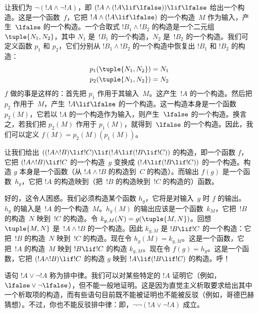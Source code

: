 \documentclass[../../../include/open-logic-section]{subfiles}
\begin{document}
\begin{ex}
让我们为 $\lnot(!A \land \lnot !A)$，即 $(!A \land (!A \lif \lfalse)) \lif \lfalse$ 给出一个构造。这是一个函数~$f$，它把 $!A \land (!A \lif \lfalse)$ 的一个构造~$M$ 作为输入，产生~$\lfalse$ 的一个构造。一个合取式 $!B_1 \land !B_2$ 的构造是一个二元组 $\tuple{N_1, N_2}$，其中 $N_1$ 是~$!B_1$ 的一个构造，$N_2$ 是~$!B_2$ 的一个构造。我们可定义函数 $p_1$ 和 $p_2$，它们分别从 $!B_1 \land !B_2$ 的一个构造中恢复出 $!B_1$ 和 $!B_2$ 的构造：
\begin{align*}
  p_1(\tuple{N_1, N_2}) &= N_1\\
  p_2(\tuple{N_1, N_2}) &= N_2
\end{align*}
$f$ 做的事是这样的：首先把 $p_1$ 作用于其输入~$M$。这产生~$!A$ 的一个构造。然后把 $p_2$ 作用于~$M$，产生~$!A \lif \lfalse$ 的一个构造。这一构造本身是一个函数~$p_2(M)$，它若以 $!A$ 的一个构造作为输入，则产生~$\lfalse$ 的一个构造。换言之，若我们把 $p_2(M)$ 作用于 $p_1(M)$，就得到~$\lfalse$ 的一个构造。因此，我们可以定义 $f(M) = p_2(M)(p_1(M))$。
\end{ex}

\begin{ex}
让我们给出 $((!A \land !B) \lif !C) \lif (!A \lif (!B \lif !C))$ 的构造，即一个函数 $f$，它把 $(!A \land !B) \lif !C$ 的一个构造~$g$ 变换成 $(!A \lif (!B \lif !C))$ 的一个构造。构造 $g$ 本身是一个函数（从 $!A \land !B$ 的构造到~$C$ 的构造）。而输出 $f(g)$ 是一个函数~$h_g$，它把 $!A$ 的构造映到（把~$!B$ 的构造映到~$!C$ 的构造的）函数。

好的，这令人困惑。我们必须构造某个函数 $h_g$，它将是对输入~$g$ 时 $f$ 的输出。~$h_g$ 的输入是~$!A$ 的一个构造~$M$。$h_g(M)$ 的输出应该是一个函数~$k_M$，它把~$!B$ 的构造~$N$ 映到~$!C$ 的构造。令 $k_{g,M}(N) = g(\tuple{M, N})$。回想 $\tuple{M, N}$ 是~$!A \land !B$ 的一个构造。因此 $k_{g,M}$ 是 $!B \lif !C$ 的一个构造：它把~$!B$ 的构造~$N$ 映到~$!C$ 的构造。现在令 $h_g(M) = k_{g,M}$。这是一个函数，它把~$!A$ 的构造~$M$ 映到 $!B \lif !C$ 的构造 $k_{g,M}$。现在令 $f(g) = h_g$。这是一个函数，它把 $(!A \land !B) \lif !C$ 的构造 $g$ 映到 $!A \lif (!B \lif !C)$ 的构造。呼！{}
\end{ex}

语句 $!A \lor \lnot !A$ 称为排中律。我们可以对某些特定的 $!A$ 证明它（例如，$\lfalse \lor \lnot \lfalse$），但不能一般地证明。这是因为直觉主义析取要求给出其中一个析取项的构造，而有些语句目前既不能被证明也不能被反驳（例如，哥德巴赫猜想）。不过，你也不能反驳排中律：即，$\lnot \lnot (!A \lor \lnot !A)$ 成立。
\end{document}
